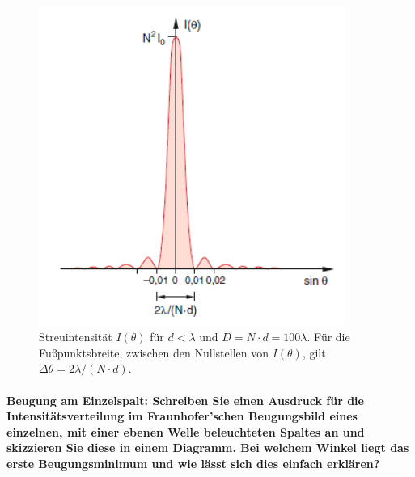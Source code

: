 \documentclass[a4paper, 11pt, ngerman, parskip=half-]{scrartcl}
\newcommand{\myparagraph}[1]{\paragraph{#1}\mbox{}\\}
\begin{document}
\begin{figure}[H]
    \centering
    \caption{Streuintensität $I(\theta)$ für $d < \lambda$ und $D = N \cdot d = 100 \lambda$. Für die Fußpunktsbreite, zwischen den Nullstellen von $I(\theta)$, gilt $\Delta \theta = 2 \lambda / (N \cdot d)$.}
    \includegraphics[width=10cm]{image/19/1.2}
\end{figure}


\myparagraph{Beugung am Einzelspalt: Schreiben Sie einen Ausdruck für die Intensitätsverteilung im
    Fraunhofer'schen Beugungsbild eines einzelnen, mit einer ebenen Welle beleuchteten
    Spaltes an und skizzieren Sie diese in einem Diagramm. Bei welchem Winkel liegt das erste
    Beugungsminimum und wie lässt sich dies einfach erklären?}
\end{document}
